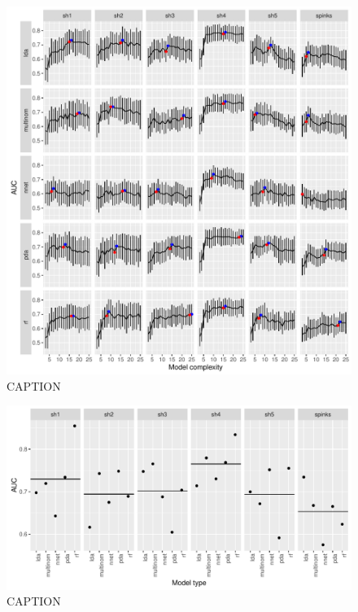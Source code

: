 \documentclass[12pt,letterpaper]{article}
\begin{document}
\begin{figure}[ht]
  \centering
  \includegraphics[height = \textheight, width = \textwidth, keepaspectratio = true]{figure/emys_model_sel}
  \caption{CAPTION}
  \label{fig:emys_sel}
\end{figure}

\begin{figure}[ht]
  \centering
  \includegraphics[height = \textheight, width = \textwidth, keepaspectratio = true]{figure/emys_oos_sel}
  \caption{CAPTION}
  \label{fig:emys_oos}
\end{figure}
\end{document}
